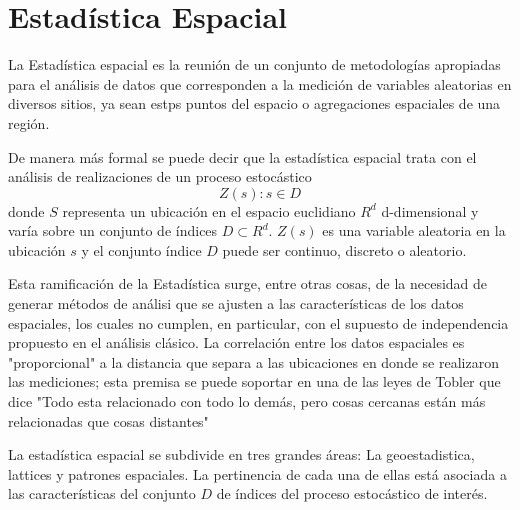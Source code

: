 


\section{Estadística Espacial}

La Estadística espacial es la reunión de un conjunto de metodologías apropiadas para el
análisis de datos que corresponden a la medición de variables aleatorias en diversos sitios, ya sean estps puntos del espacio o agregaciones espaciales de una región. 

De manera más formal se puede decir que la estadística espacial trata con el análisis de 
realizaciones de un proceso estocástico   $${ Z ( s ) : s \in D }$$  donde $S$ representa un ubicación en el espacio euclidiano $R^d$ d-dimensional y varía sobre un conjunto de índices $D \subset R^d$.  $Z(s)$ es una variable aleatoria en
la ubicación $s$ y el conjunto índice $D$ puede ser continuo, discreto o aleatorio.\cite{giraldo}


Esta ramificación de la Estadística surge, entre otras cosas, de la necesidad de generar métodos de análisi que se ajusten a las características de los datos espaciales, los cuales no cumplen, en particular, con el supuesto de independencia propuesto en el análisis clásico. La correlación entre los datos espaciales es "proporcional" a la distancia que separa a las ubicaciones en donde se realizaron las mediciones; esta premisa se puede soportar en una de las leyes de Tobler que dice "Todo esta relacionado con todo lo demás, pero cosas cercanas están más relacionadas que cosas distantes"\cite{notas_clase2}


La estadística espacial se subdivide en tres grandes áreas: La geoestadistica, lattices y patrones espaciales. La pertinencia de cada una
de ellas está asociada a las características del conjunto $D$ de índices del proceso estocástico
de interés. 

  
